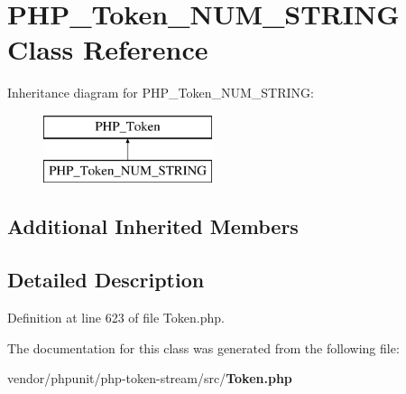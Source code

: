 \section{P\+H\+P\+\_\+\+Token\+\_\+\+N\+U\+M\+\_\+\+S\+T\+R\+I\+N\+G Class Reference}
\label{class_p_h_p___token___n_u_m___s_t_r_i_n_g}
Inheritance diagram for P\+H\+P\+\_\+\+Token\+\_\+\+N\+U\+M\+\_\+\+S\+T\+R\+I\+N\+G\+:\begin{figure}[H]
\begin{center}
\leavevmode
\includegraphics[height=2.000000cm]{class_p_h_p___token___n_u_m___s_t_r_i_n_g}
\end{center}
\end{figure}
\subsection*{Additional Inherited Members}


\subsection{Detailed Description}


Definition at line 623 of file Token.\+php.



The documentation for this class was generated from the following file\+:\begin{DoxyCompactItemize}
\item 
vendor/phpunit/php-\/token-\/stream/src/{\bf Token.\+php}\end{DoxyCompactItemize}
